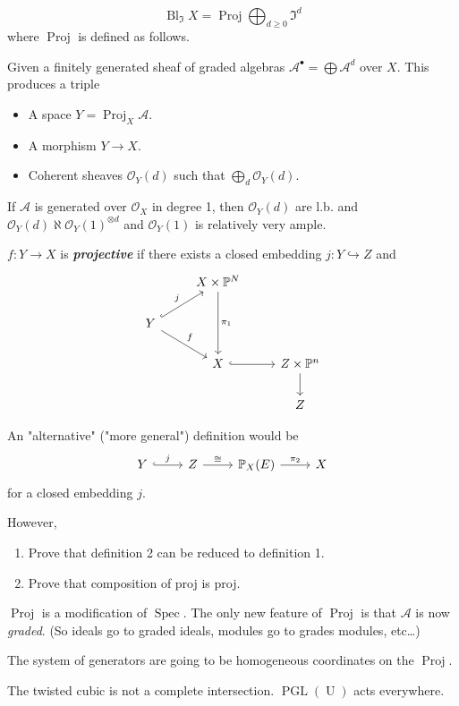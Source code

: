\documentclass{article}
\renewcommand{\P}{\mathbb{P}}
\newcommand{\Ac}{\mathcal{A}}
\newcommand{\Oc}{\mathcal{O}}
\newcommand{\If}{\mathfrak{I}}
\DeclareMathOperator{\Spec}{Spec}
\DeclareMathOperator{\Bl}{Bl}
\DeclareMathOperator{\Proj}{Proj}
\DeclareMathOperator{\U}{U}
\DeclareMathOperator{\PGL}{PGL}
\begin{document}
\begin{defn}
	\[\Bl_{\If}X=\Proj\bigoplus_{d\geq0}\If^d\]
	where $\Proj$ is defined as follows.
\end{defn}
\begin{defn}[1]
	Given a finitely generated sheaf of graded algebras $\Ac^\bullet=\bigoplus\Ac^d$ over $X$. This produces a triple
	\begin{itemize}
		\item A space $Y=\Proj_X\Ac$.
		\item A morphism $Y\to X$.
		\item Coherent sheaves $\Oc_Y(d)$ such that $\bigoplus_d\Oc_Y(d)$.
	\end{itemize}
	If $\Ac$ is generated over $\Oc_X$ in degree 1, then $\Oc_Y(d)$ are l.b. and $\Oc_Y(d)\aleph\Oc_Y(1)^{\otimes d}$ and $\Oc_Y(1)$ is relatively very ample.
	
	$f:Y\to X$ is \textbf{\textit{projective}} if there exists a closed embedding $j:Y\hookrightarrow Z$ and
	\[\begin{tikzcd}
		&X\times\P^N\arrow[dd,"\pi_1"]\\
		Y\arrow[ur,hook,"j"]\arrow[dr,"f"]&\\
		&X\arrow[r,hook]&Z\times \P^n\arrow[d]\\
		&&Z
	\end{tikzcd}\]
\end{defn}
\begin{defn}[2]
	An "alternative" ("more general") definition would be
	\[\begin{tikzcd}
		Y\arrow[r,hook,"j"]&Z\arrow[r,"\cong"]&\P_X(E)\arrow[r,"\pi_2"]&X
	\end{tikzcd}\]
	for a closed embedding $j$.
\end{defn}
However,
\begin{exercise}\leavevmode
	\begin{enumerate}
		\item Prove that definition 2 can be reduced to definition 1.
		\item Prove that composition of proj is proj.
	\end{enumerate}
\end{exercise}
\begin{remark}
	$\Proj$ is a modification of $\Spec$. The only new feature of $\Proj$ is that $\Ac$ is now \textit{graded}. (So ideals go to graded ideals, modules go to grades modules, etc…)
\end{remark}
The system of generators are going to be homogeneous coordinates on the $\Proj$.
\begin{example}
	The twisted cubic is not a complete intersection. $\PGL(\U)$ acts everywhere.
\end{example}
\end{document}
